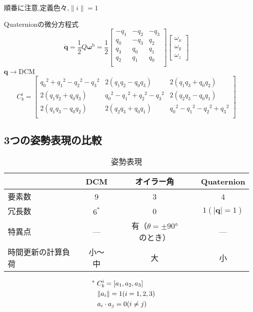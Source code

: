 \documentclass[class=article, crop=false, dvipdfmx, fleqn]{standalone}
\begin{document}
\textcolor{emph}{%
順番に注意,定義色々,$\|i\| = 1$
}

Quaternionの微分方程式
\begin{equation}
\dot{\bm{q}} = \frac{1}{2} Q \bm{\omega}^\mathrm{b}
	= \frac{1}{2}
    \begin{bmatrix}
    -q_1 & -q_2 & -q_3 \\
    q_0 & -q_3 & q_2 \\
    q_3 & q_0 & q_1 \\
    q_2%
    & q_1 & q_0 \\
    \end{bmatrix}
    \begin{bmatrix}
    \omega_x \\
    \omega_y \\
    \omega_z
    \end{bmatrix}
\end{equation}
$\bm{q} \rightarrow$DCM
\begin{equation}
C_b^i = 
\begin{bmatrix}
{q_0}^2 + {q_1}^2 - {q_2}^2 - {q_3}^2 
& 2(q_1 q_2 - q_0 q_3)
& 2(q_1 q_3 + q_0 q_2) \\
2(q_1 q_2 + q_0 q_3)
& {q_0}^2 - {q_1}^2 + {q_2}^2 - {q_3}^2 
& 2(q_2 q_3 - q_0 q_1) \\
2(q_1 q_3 - q_0 q_2) 
& 2(q_2 q_3 + q_0 q_1) 
& {q_0}^2 - {q_1}^2 - {q_2}^2 + {q_3}^2 \\
\end{bmatrix}
\end{equation}


\subsection{3つの姿勢表現の比較}
\begin{table}[H]
\centering
\caption{姿勢表現}
\begin{tabular}{>{\centering}p{}|c|c|c}
 & DCM & オイラー角 & Quaternion \\ \hline
要素数 & 9 & 3 & 4 \\ \hline
冗長数 & \hspace{4pt}$6^*$ & 0 & $1(|\bm{q}| = 1)$ \\ \hline
特異点 & --- & 有（$\theta = \pm\ang{90}$のとき） & --- \\ \hline
時間更新の計算負荷 & 小～中 & 大 & 小
\end{tabular}
\end{table}

\begin{align}
& \hspace{-8pt} {}^* \;C^i_b = [a_1, a_2, a_3] \\
& \| a_i\| = 1(i=1,2,3) \\
& a_i \cdot a_j = 0 (i \ne j)
\end{align}
\end{document}

